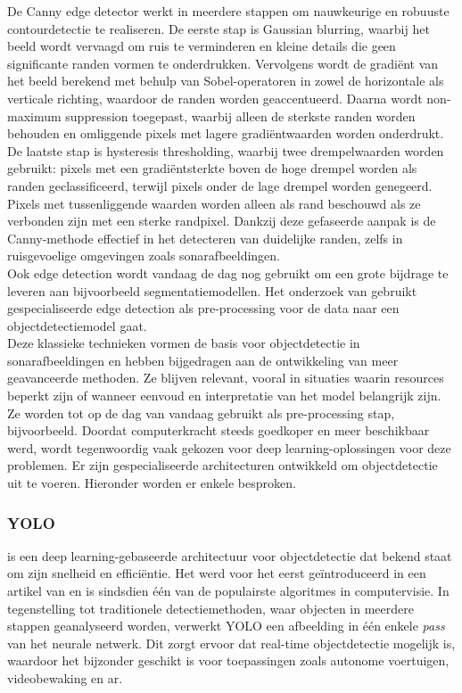 De Canny edge detector werkt in meerdere stappen om nauwkeurige en robuuste contourdetectie te realiseren. De eerste stap is Gaussian blurring, waarbij het beeld wordt vervaagd om ruis te verminderen en kleine details die geen significante randen vormen te onderdrukken. Vervolgens wordt de gradiënt van het beeld berekend met behulp van Sobel-operatoren in zowel de horizontale als verticale richting, waardoor de randen worden geaccentueerd. Daarna wordt non-maximum suppression toegepast, waarbij alleen de sterkste randen worden behouden en omliggende pixels met lagere gradiëntwaarden worden onderdrukt. De laatste stap is hysteresis thresholding, waarbij twee drempelwaarden worden gebruikt: pixels met een gradiëntsterkte boven de hoge drempel worden als randen geclassificeerd, terwijl pixels onder de lage drempel worden genegeerd. Pixels met tussenliggende waarden worden alleen als rand beschouwd als ze verbonden zijn met een sterke randpixel. Dankzij deze gefaseerde aanpak is de Canny-methode effectief in het detecteren van duidelijke randen, zelfs in ruisgevoelige omgevingen zoals sonarafbeeldingen. \autocite{Ding_2001} \\

Ook edge detection wordt vandaag de dag nog gebruikt om een grote bijdrage te leveren aan bijvoorbeeld segmentatiemodellen. Het onderzoek van \textcite{Priyadharsini_2019} gebruikt gespecialiseerde edge detection als pre-processing voor de data naar een objectdetectiemodel gaat. \\

Deze klassieke technieken vormen de basis voor objectdetectie in sonarafbeeldingen en hebben bijgedragen aan de ontwikkeling van meer geavanceerde methoden. Ze blijven relevant, vooral in situaties waarin resources beperkt zijn of wanneer eenvoud en interpretatie van het model belangrijk zijn. Ze worden tot op de dag van vandaag gebruikt als pre-processing stap, bijvoorbeeld. Doordat computerkracht steeds goedkoper en meer beschikbaar werd, wordt tegenwoordig vaak gekozen voor deep learning-oplossingen voor deze problemen. Er zijn gespecialiseerde architecturen ontwikkeld om objectdetectie uit te voeren. Hieronder worden er enkele besproken.

\subsubsection{YOLO}

 is een deep learning-gebaseerde architectuur voor objectdetectie dat bekend staat om zijn snelheid en efficiëntie. Het werd voor het eerst geïntroduceerd in een artikel van \textcite{Redmon_2016} en is sindsdien één van de populairste algoritmes in computervisie. In tegenstelling tot traditionele detectiemethoden, waar objecten in meerdere stappen geanalyseerd worden, verwerkt YOLO een afbeelding in één enkele \emph{pass} van het neurale netwerk. Dit zorgt ervoor dat real-time objectdetectie mogelijk is, waardoor het bijzonder geschikt is voor toepassingen zoals autonome voertuigen, videobewaking en \gls{ar}.


